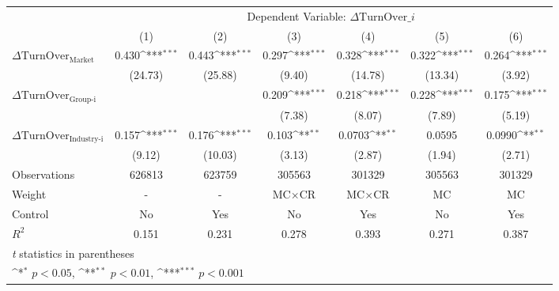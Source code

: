 {
\def\sym#1{\ifmmode^{#1}\else\(^{#1}\)\fi}
\begin{tabular}{l*{6}{c}}
\hline\hline
                    &\multicolumn{6}{c}{Dependent Variable: $\Delta \text{TurnOver}\_{i} $ }                                                             \\\cmidrule(lr){2-7}
                    &\multicolumn{1}{c}{(1)}         &\multicolumn{1}{c}{(2)}         &\multicolumn{1}{c}{(3)}         &\multicolumn{1}{c}{(4)}         &\multicolumn{1}{c}{(5)}         &\multicolumn{1}{c}{(6)}         \\
\hline
 $ \Delta \text{TurnOver}_{\text{Market}} $ &       0.430\sym{***}&       0.443\sym{***}&       0.297\sym{***}&       0.328\sym{***}&       0.322\sym{***}&       0.264\sym{***}\\
                    &     (24.73)         &     (25.88)         &      (9.40)         &     (14.78)         &     (13.34)         &      (3.92)         \\
[1em]
 $ \Delta \text{TurnOver}_{\text{Group-i}} $ &                     &                     &       0.209\sym{***}&       0.218\sym{***}&       0.228\sym{***}&       0.175\sym{***}\\
                    &                     &                     &      (7.38)         &      (8.07)         &      (7.89)         &      (5.19)         \\
[1em]
 $ \Delta \text{TurnOver}_{\text{Industry-i}} $ &       0.157\sym{***}&       0.176\sym{***}&       0.103\sym{**} &      0.0703\sym{**} &      0.0595         &      0.0990\sym{**} \\
                    &      (9.12)         &     (10.03)         &      (3.13)         &      (2.87)         &      (1.94)         &      (2.71)         \\
\hline
Observations        &      626813         &      623759         &      305563         &      301329         &      305563         &      301329         \\
Weight              &           -         &           -         & $ \text{MC} \times \text{CR} $          & $ \text{MC} \times \text{CR} $          & $ \text{MC} $          & $ \text{MC} $          \\
Control             &          No         &         Yes         &          No         &         Yes         &          No         &         Yes         \\
$ R^2 $             &       0.151         &       0.231         &       0.278         &       0.393         &       0.271         &       0.387         \\
\hline\hline
\multicolumn{7}{l}{\footnotesize \textit{t} statistics in parentheses}\\
\multicolumn{7}{l}{\footnotesize \sym{*} \(p<0.05\), \sym{**} \(p<0.01\), \sym{***} \(p<0.001\)}\\
\end{tabular}
}
